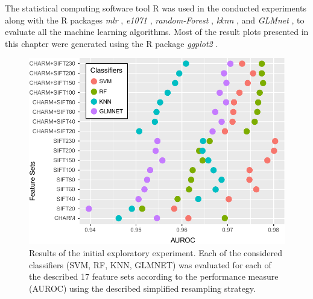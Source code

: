 The statistical computing software tool R \cite{team2016vienna} was used in the conducted experiments along with the R packages \textit{mlr} \cite{bischl2016mlr}, \textit{e1071} \cite{meyer2017e1071}, \textit{random-Forest} \cite{liaw2002classification}, \textit{kknn} \cite{schliep2016kknn}, and \textit{GLMnet} \cite{friedman2010regularization}, to evaluate all the machine learning algorithms. Most of the result plots presented in this chapter were generated using the R package \textit{ggplot2} \cite{wickham2009ggplot2}.
\begin{figure}[h!]
	\centering
	\includegraphics[width=0.9\columnwidth]{fig04}
	\caption{Results of the initial exploratory experiment. Each of the considered classifiers (SVM, RF, KNN, GLMNET) was evaluated for each of the described 17 feature sets according to the performance measure (AUROC) using the described simplified resampling strategy.}
	\label{ch5_fig4}
\end{figure}
